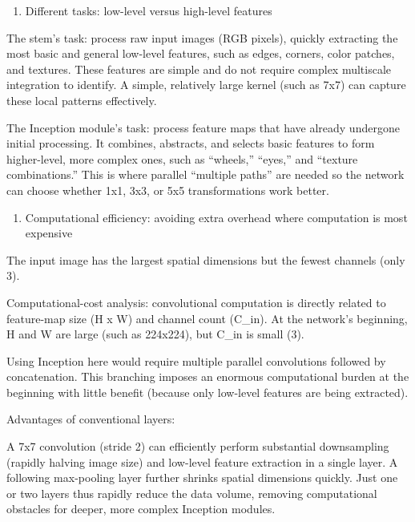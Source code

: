 \begin{enumerate}
\def\labelenumi{(\arabic{enumi})}
\tightlist
\item
  Different tasks: low-level versus high-level features
\end{enumerate}

The stem's task: process raw input images (RGB pixels), quickly extracting the most basic and general low-level features, such as edges, corners, color patches, and textures. These features are simple and do not require complex multiscale integration to identify. A simple, relatively large kernel (such as 7x7) can capture these local patterns effectively.

The Inception module's task: process feature maps that have already undergone initial processing. It combines, abstracts, and selects basic features to form higher-level, more complex ones, such as ``wheels,'' ``eyes,'' and ``texture combinations.'' This is where parallel ``multiple paths'' are needed so the network can choose whether 1x1, 3x3, or 5x5 transformations work better.

\begin{enumerate}
\def\labelenumi{(\arabic{enumi})}
\setcounter{enumi}{1}
\tightlist
\item
  Computational efficiency: avoiding extra overhead where computation is most expensive
\end{enumerate}

The input image has the largest spatial dimensions but the fewest channels (only 3).

Computational-cost analysis: convolutional computation is directly related to feature-map size (H x W) and channel count (C\_in). At the network's beginning, H and W are large (such as 224x224), but C\_in is small (3).

Using Inception here would require multiple parallel convolutions followed by concatenation. This branching imposes an enormous computational burden at the beginning with little benefit (because only low-level features are being extracted).

Advantages of conventional layers:

A 7x7 convolution (stride 2) can efficiently perform substantial downsampling (rapidly halving image size) and low-level feature extraction in a single layer. A following max-pooling layer further shrinks spatial dimensions quickly. Just one or two layers thus rapidly reduce the data volume, removing computational obstacles for deeper, more complex Inception modules.

